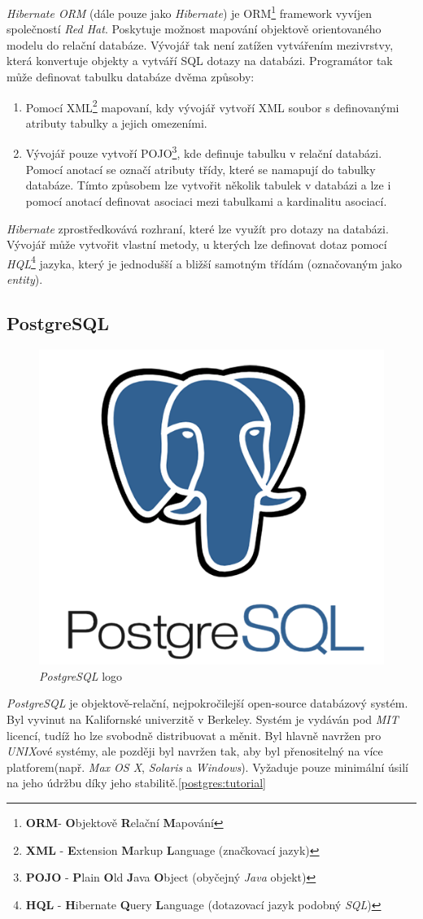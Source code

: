 \emph{Hibernate ORM} (dále pouze jako \emph{Hibernate}) je ORM\footnote{\textbf{ORM}- \textbf{O}bjektově \textbf{R}elační \textbf{M}apování} framework vyvíjen společností \emph{Red Hat}.
Poskytuje možnost mapování objektově orientovaného modelu do relační databáze.
Vývojář tak není zatížen vytvářením mezivrstvy, která konvertuje objekty a vytváří SQL dotazy na databázi.
Programátor tak může definovat tabulku databáze dvěma způsoby:
\begin{enumerate}
  \item Pomocí XML\footnote{\textbf{XML} - \textbf{E}xtension \textbf{M}arkup \textbf{L}anguage (značkovací jazyk)} mapovaní, kdy vývojář vytvoří XML soubor s definovanými atributy tabulky a jejich omezeními.
  \item Vývojář pouze vytvoří POJO\footnote{\textbf{POJO} - \textbf{P}lain \textbf{O}ld \textbf{J}ava \textbf{O}bject (obyčejný \emph{Java} objekt)}, kde definuje tabulku v relační databázi. Pomocí anotací se označí atributy třídy, které se namapují do tabulky databáze.
        Tímto způsobem lze vytvořit několik tabulek v databázi a lze i pomocí anotací definovat asociaci mezi tabulkami a kardinalitu asociací.
\end{enumerate}
\emph{Hibernate} zprostředkovává rozhraní, které lze využít pro dotazy na databázi.
Vývojář může vytvořit vlastní metody, u kterých lze definovat dotaz pomocí \emph{HQL}\footnote{\textbf{HQL} - \textbf{H}ibernate \textbf{Q}uery \textbf{L}anguage (dotazovací jazyk podobný \emph{SQL})} jazyka,
který je jednodušší a bližší samotným třídám (označovaným jako \emph{entity}).

\subsection*{PostgreSQL}
\label{pouzite:postgresql}
\begin{figure}[hbt]
  \centering
  \includegraphics[width=.2 \linewidth]{obrazky-figures/postgresql-logo.png}
  \caption{\emph{PostgreSQL} logo}
\end{figure}

\emph{PostgreSQL} je objektově-relační, nejpokročilejší open-source databázový systém.
Byl vyvinut na Kalifornské univerzitě v Berkeley.
Systém je vydáván pod \emph{MIT} licencí, tudíž ho lze svobodně distribuovat a měnit.
Byl hlavně navržen pro \emph{UNIX}ové systémy, ale později byl navržen tak, aby byl přenositelný na více platforem(např. \emph{Max OS X}, \emph{Solaris} a \emph{Windows}).
Vyžaduje pouze minimální úsilí na jeho údržbu díky jeho stabilitě.\ref{postgres:tutorial}

